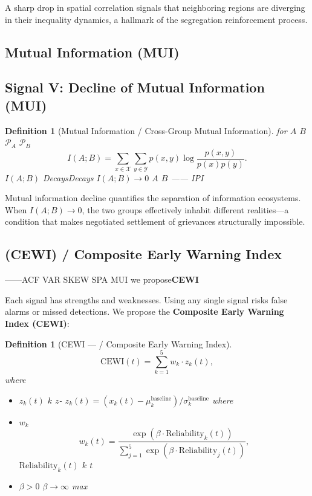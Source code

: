 \documentclass[11pt,a4paper]{article}
\newtheorem{definition}[theorem]{Definition}
\theoremstyle{remark}
\newcommand{\paren}[1]{\left(#1\right)}
\begin{document}
A sharp drop in spatial correlation signals that neighboring regions are diverging
in their inequality dynamics, a hallmark of the segregation reinforcement process.

\subsection{Mutual Information (MUI)}
\subsection{Signal V: Decline of Mutual Information (MUI)}

\begin{definition}[Mutual Information / Cross-Group Mutual Information]
\label{def:mui}
for $A$  $B$  $\mathcal{P}_A$  $\mathcal{P}_B$
\[
I(A; B) = \sum_{x \in \mathcal{X}} \sum_{y \in \mathcal{Y}} 
          p(x,y) \log \frac{p(x,y)}{p(x)p(y)}.
\]
\textbf{} $I(A; B)$ DecaysDecays
$I(A; B) \to 0$  $A$  $B$ ——
 IPI 
\end{definition}

Mutual information decline quantifies the separation of information ecosystems.
When $I(A; B) \to 0$, the two groups effectively inhabit different realities—a
condition that makes negotiated settlement of grievances structurally impossible.

\subsection{ (CEWI) / Composite Early Warning Index}

——ACF VAR SKEW 
SPA MUI 
we propose\textbf{CEWI}

Each signal has strengths and weaknesses. Using any single signal risks false alarms
or missed detections. We propose the \textbf{Composite Early Warning Index (CEWI)}:

\begin{definition}[CEWI —  / Composite Early Warning Index]
\label{def:CEWI}
\[
\text{CEWI}(t) = \sum_{k=1}^{5} w_k \cdot z_k(t),
\]
where
\begin{itemize}
    \item $z_k(t)$  $k$  $z$-
          $z_k(t) = (x_k(t) - \mu_k^{\text{baseline}}) / \sigma_k^{\text{baseline}}$
          where
    \item $w_k$ 
          \[
          w_k(t) = \frac{\exp\paren{\beta \cdot \text{Reliability}_k(t)}}
                       {\sum_{j=1}^{5} \exp\paren{\beta \cdot \text{Reliability}_j(t)}},
          \]
          $\text{Reliability}_k(t)$  $k$  $t$ 
    \item $\beta > 0$ $\beta \to \infty$  max 
\end{itemize}
\end{definition}
\end{document}
